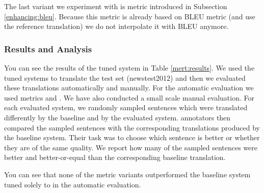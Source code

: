 The last variant we experiment with is  metric introduced
in Subsection \ref{enhancing:bleu}. Because this metric is already based on
BLEU metric (and use the reference translation) we do not interpolate it with
BLEU anymore.


\subsubsection{Results and Analysis}

You can see the results of the tuned system in Table \ref{mert:results}. We
used the tuned systems to translate the test set (newstest2012) and then we
evaluated these translations automatically and manually. For the automatic
evaluation we used metrics   and
 . We have also conducted a small
scale manual evaluation. For each evaluated system, we randomly sampled
 sentences which were translated differently by the baseline and by
the evaluated system.  annotators then compared the sampled
sentences with the corresponding translations produced by the baseline system.
Their task was to choose which sentence is better or whether they are of the
same quality. We report how many of the sampled sentences were better and
better-or-equal than the corresponding baseline translation.

You can see that none of the metric variants outperformed the baseline system
tuned solely to  in the automatic evaluation.

